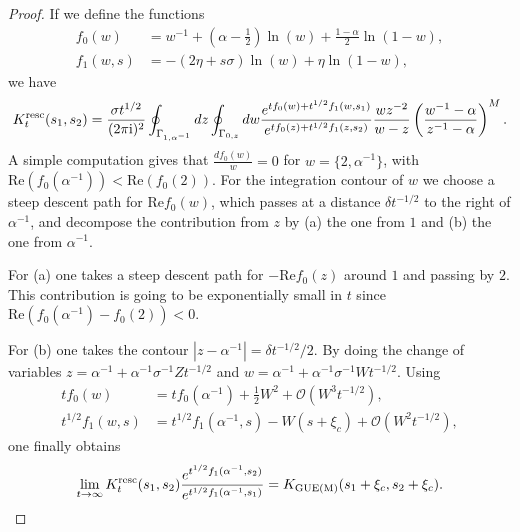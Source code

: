 \documentclass[12pt,a4paper]{article}
\numberwithin{equation}{section}
\newcommand{\Or}{\mathcal{O}}
\newcommand{\I}{{\rm i}}
\renewcommand{\Re}{\mathrm{Re}}
\begin{document}
\begin{proof}
If we define the functions
\begin{equation}
\begin{aligned}
f_0(w)&=w^{-1}+(\alpha-\tfrac12)\ln(w)+\tfrac{1-\alpha}{2}\ln(1-w),\\
f_1(w,s)&=-(2\eta+s \sigma)\ln(w)+\eta\ln(1-w),
\end{aligned}
\end{equation}
we have
\begin{equation}
K^{\rm resc}_t(s_1,s_2) = \frac{\sigma t^{1/2}}{(2\pi\I)^2}\oint_{\Gamma_{1,\alpha^{-1}}} dz \oint_{\Gamma_{0,z}}dw \frac{e^{t f_0(w)+t^{1/2} f_1(w,s_1)}}{e^{t f_0(z)+ t^{1/2} f_1(z,s_2)}}\frac{w z^{-2}}{w-z}\left(\frac{w^{-1}-\alpha}{z^{-1}-\alpha}\right)^M.
\end{equation}
A simple computation gives that $\frac{df_0(w)}{w}=0$ for $w=\{2,\alpha^{-1}\}$, with $\Re(f_0(\alpha^{-1}))<\Re(f_0(2))$. For the integration contour of $w$ we choose a steep descent path for $\Re f_0(w)$, which passes at a distance $\delta t^{-1/2}$ to the right of $\alpha^{-1}$, and decompose the contribution from $z$ by (a) the one from $1$ and (b) the one from $\alpha^{-1}$.

For (a) one takes a steep descent path for $-\Re f_0(z)$ around $1$ and passing by $2$. This contribution is going to be exponentially small in $t$ since $\Re(f_0(\alpha^{-1})-f_0(2))<0$.

For (b) one takes the contour $|z-\alpha^{-1}|=\delta t^{-1/2}/2$. By doing the change of variables $z=\alpha^{-1}+\alpha^{-1}\sigma^{-1}Z t^{-1/2}$ and $w=\alpha^{-1}+\alpha^{-1}\sigma^{-1}W t^{-1/2}$. Using
\begin{equation}
\begin{aligned}
t f_0(w)&= t f_0(\alpha^{-1})+\frac12 W^2+\Or(W^3 t^{-1/2}),\\
t^{1/2} f_1(w,s)&=t^{1/2} f_1(\alpha^{-1},s) -W(s+\xi_c)+\Or(W^2 t^{-1/2}),
\end{aligned}
\end{equation}
one finally obtains
\begin{equation}
\lim_{t\to\infty} K^{\rm resc}_t(s_1,s_2) \frac{e^{t^{1/2} f_1(\alpha^{-1},s_2)}}{e^{t^{1/2} f_1(\alpha^{-1},s_1)}} = K_{\rm GUE(M)}(s_1+\xi_c,s_2+\xi_c).
\end{equation}
\end{proof}
\end{document}
